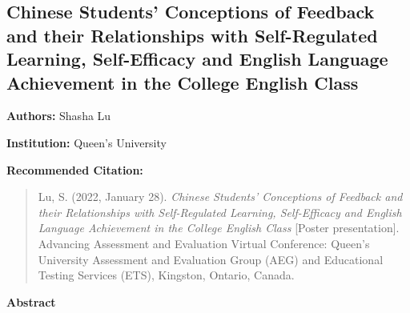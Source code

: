 \documentclass[
]{book}
\begin{document}
\newpage

\hypertarget{chinese-students-conceptions-of-feedback-and-their-relationships-with-self-regulated-learning-self-efficacy-and-english-language-achievement-in-the-college-english-class}{%
\subsection{Chinese Students' Conceptions of Feedback and their Relationships with Self-Regulated Learning, Self-Efficacy and English Language Achievement in the College English Class}\label{chinese-students-conceptions-of-feedback-and-their-relationships-with-self-regulated-learning-self-efficacy-and-english-language-achievement-in-the-college-english-class}}

\textbf{Authors:} Shasha Lu

\textbf{Institution:} Queen's University

\textbf{Recommended Citation:}

\begin{quote}
Lu, S. (2022, January 28). \emph{Chinese Students' Conceptions of Feedback and their Relationships with Self-Regulated Learning, Self-Efficacy and English Language Achievement in the College English Class} {[}Poster presentation{]}. Advancing Assessment and Evaluation Virtual Conference: Queen's University Assessment and Evaluation Group (AEG) and Educational Testing Services (ETS), Kingston, Ontario, Canada.
\end{quote}

\textbf{Abstract}
\end{document}
